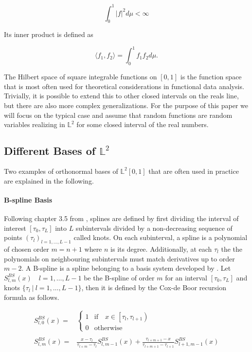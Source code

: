 \documentclass[11pt,twoside,a4paper]{article}
\begin{document}
	\begin{equation}
		\int_{0}^{1} \lvert f \rvert^2 d\mu < \infty
	\end{equation}
	
	Its inner product is defined as
	
	\begin{equation}
		\langle f_1, f_2 \rangle = \int_{0}^{1} f_1 f_2 d\mu.
	\end{equation}
	
	The Hilbert space of square integrable functions on $[0,1]$ is the function space that is most often used for theoretical considerations in functional data analysis. Trivially, it is possible to extend this to other closed intervals on the reals line, but there are also more complex generalizations. For the purpose of this paper we will focus on the typical case and assume that random functions are random variables realizing in $\mathbb{L}^2$ for some closed interval of the real numbers. 
	
	\subsection{Different Bases of $\mathbb{L}^2$}
	Two examples of orthonormal bases of $\mathbb{L}^2[0,1]$ that are often used in practice are explained in the following.
	
	\paragraph{B-spline Basis} Following chapter 3.5 from \cite{ramsay_functional_2005}, splines are defined by first dividing the interval of interest $[\tau_0, \tau_L]$ into $L$ subintervals divided by a non-decreasing sequence of points $(\tau_l)_{l = 1,\dots, L-1}$ called knots. On each subinterval, a spline is a polynomial of chosen order $m = n+1$ where $n$ is its degree. Additionally, at each $\tau_l$ the the polynomials on neighbouring subintervals must match derivatives up to order $m-2$.
	A B-spline is a spline belonging to a basis system developed by \cite{de_boor_practical_1978}. Let $S_{l,m}^{BS}(x) \quad l = 1,\dots,L-1$ be the B-spline of order $m$ for an interval $[\tau_0, \tau_L]$ and knots $\{\tau_l \: \vert \: l = 1,\dots, L-1\}$, then it is defined by the Cox-de Boor recursion formula as follows. 
	
	\begin{equation}
	\begin{split}
		S_{l,0}^{BS}(x) = &
		\begin{cases}
			1 & \text{if} \quad x \in \left[\tau_l, \tau_{l+1}\right)\\
			0 & \text{otherwise}
		\end{cases}\\ \\
		S_{l,m}^{BS}(x) = &\frac{x - \tau_l}{\tau_{l+m} - \tau_l} S_{l,m-1}^{BS}(x) + \frac{\tau_{l+m+1} - x}{\tau_{l+m+1} - \tau_{l+1}} S_{l+1,m-1}^{BS}(x)
	\end{split}
	\end{equation}
	
\end{document}

